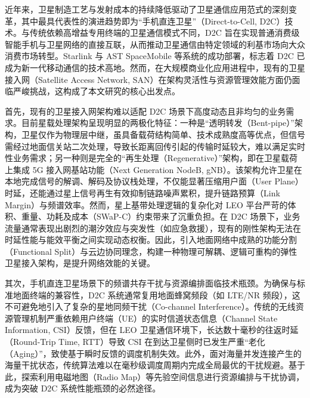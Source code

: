 \documentclass[type=master]{fduthesis}
\begin{document}
近年来，卫星制造工艺与发射成本的持续降低驱动了卫星通信应用范式的深刻变革，其中最具代表性的演进趋势即为“手机直连卫星”（Direct-to-Cell, D2C）技术\cite{SYH2023, LSD2024}。与传统依赖高增益专用终端的卫星通信模式不同，D2C 旨在实现普通消费级智能手机与卫星网络的直接互联，从而推动卫星通信由特定领域的利基市场向大众消费市场转型\cite{rappaport2025spectrum}。Starlink 与 AST SpaceMobile 等系统的成功部署，标志着 D2C 已成为新一代移动通信的技术高地\cite{Starlink2025Direct, AST2025MNO}。然而，在大规模商业化应用进程中，现有的卫星接入网（Satellite Access Network, SAN）在架构灵活性与资源管理效能方面仍面临严峻挑战，这构成了本文研究的核心出发点。

首先，现有的卫星接入网架构难以适配 D2C 场景下高度动态且非均匀的业务需求。目前星载处理架构呈现明显的两极化特征：一种是“透明转发（Bent-pipe）”架构，卫星仅作为物理层中继，虽具备载荷结构简单、技术成熟度高等优点，但信号需经过地面信关站二次处理，导致长距离回传引起的传输时延较大，难以满足实时性业务需求；另一种则是完全的“再生处理（Regenerative）”架构，即在卫星载荷上集成 5G 接入网基站功能（Next Generation NodeB, gNB）。该架构允许卫星在本地完成信号的解调、解码及协议栈处理，不仅能显著压缩用户面（User Plane）时延，还能通过星上信号再生有效抑制链路噪声累积，提升链路预算（Link Margin）与频谱效率。然而，星上基带处理逻辑的复杂化对 LEO 平台严苛的体积、重量、功耗及成本（SWaP-C）约束带来了沉重负担\cite{xiao2022leo, yahia2024scalable}。在 D2C 场景下，业务流量通常表现出剧烈的潮汐效应与突发性（如应急救援），现有的刚性架构无法在时延性能与能效平衡之间实现动态权衡\cite{kong2025flexsan}。因此，引入地面网络中成熟的功能分割（Functional Split）与云边协同理念，构建一种物理可解耦、逻辑可重构的弹性卫星接入架构，是提升网络效能的关键\cite{jia2021vnf, alba2022dynamic}。

其次，手机直连卫星场景下的频谱共存干扰与资源编排面临技术瓶颈。为确保与标准地面终端的兼容性，D2C 系统通常复用地面蜂窝频段（如 LTE/NR 频段），这不可避免地引入了复杂的星地同频干扰（Co-channel Interference）\cite{heydarishahreza2024spectrum, lim2023interference}。传统的无线资源管理机制严重依赖用户终端（UE）的实时信道状态信息（Channel State Information, CSI）反馈，但在 LEO 卫星通信环境下，长达数十毫秒的往返时延（Round-Trip Time, RTT）导致 CSI 在到达卫星侧时已发生严重“老化（Aging）”，致使基于瞬时反馈的调度机制失效\cite{ZHU2025Interference, tuzi2023distributed}。此外，面对海量并发连接产生的海量干扰状态，传统算法难以在毫秒级调度周期内完成全局最优的干扰规避\cite{li2024radio}。基于此，探索利用电磁地图（Radio Map）等先验空间信息进行资源编排与干扰协调，成为突破 D2C 系统性能瓶颈的必然途径\cite{li2024radio}。
\end{document}
